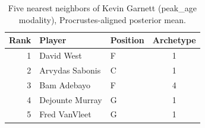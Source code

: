 \begin{table}[htbp]
  \centering\small
  \begin{tabular}{rllc}
    \toprule
    Rank & Player & Position & Archetype \\
    \midrule
    1 & David West & F & 1 \\
    2 & Arvydas Sabonis & C & 1 \\
    3 & Bam Adebayo & F & 4 \\
    4 & Dejounte Murray & G & 1 \\
    5 & Fred VanVleet & G & 1 \\
    \bottomrule
  \end{tabular}
  \caption{Five nearest neighbors of Kevin Garnett (peak_age modality), Procrustes-aligned posterior mean.}
  \label{tab:Kevin_Garnett_neighbors_peak_age}
\end{table}

